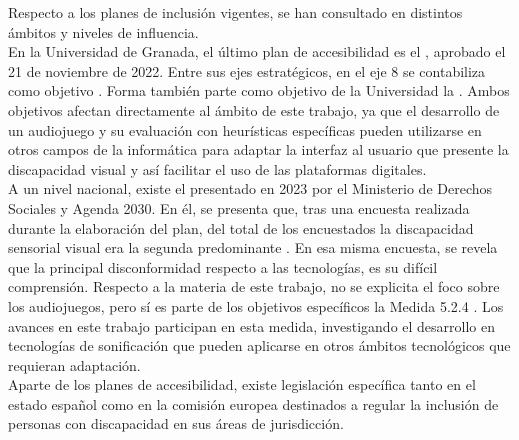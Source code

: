  Respecto a los planes de inclusión vigentes, se han consultado en distintos ámbitos y niveles de influencia.\\
 
 En la Universidad de Granada, el último plan de accesibilidad es el , aprobado el 21 de noviembre de 2022. Entre sus ejes estratégicos, en el eje 8  se contabiliza como objetivo  \cite[p ~103]{iplan-accesibilidad-ugr}. Forma también parte como objetivo de la Universidad la \cite[p ~104]{iplan-accesibilidad-ugr}. Ambos objetivos afectan directamente al ámbito de este trabajo, ya que el desarrollo de un audiojuego y su evaluación con heurísticas específicas pueden utilizarse en otros campos de la informática para adaptar la interfaz al usuario que presente la discapacidad visual y así facilitar el uso de las plataformas digitales.\\
 
 A un nivel nacional, existe el  presentado en 2023 por el Ministerio de Derechos Sociales y Agenda 2030. En él, se presenta que, tras una encuesta realizada durante la elaboración del plan, del total de los encuestados la discapacidad sensorial visual era la segunda predominante \cite[p ~54]{plan-nacional-accesibilidad-2023}. En esa misma encuesta, se revela que la principal disconformidad respecto a las tecnologías, es su difícil comprensión. Respecto a la materia de este trabajo, no se explicita el foco sobre los audiojuegos, pero sí es parte de los objetivos específicos la Medida 5.2.4  \cite[p ~41]{plan-nacional-accesibilidad-2023}. Los avances en este trabajo participan en esta medida, investigando el desarrollo en tecnologías de sonificación que pueden aplicarse en otros ámbitos tecnológicos que requieran adaptación.\\
 
 Aparte de los planes de accesibilidad, existe legislación específica tanto en el estado español como en la comisión europea destinados a regular la inclusión de personas con discapacidad en sus áreas de jurisdicción.\\
 

